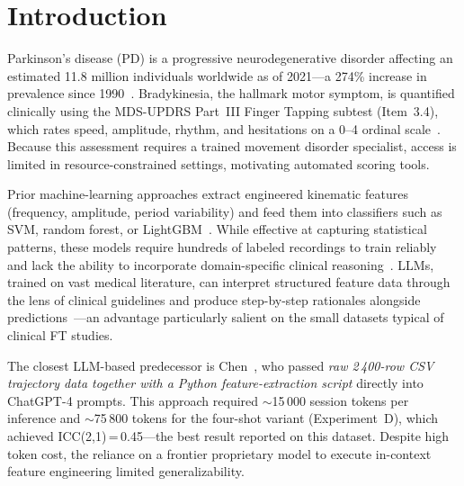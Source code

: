 \documentclass[conference]{IEEEtran}
\begin{document}
\section{Introduction}

Parkinson's disease (PD) is a progressive neurodegenerative disorder affecting an
estimated 11.8 million individuals worldwide as of 2021---a 274\% increase in prevalence
since 1990~\cite{steinmetz2024global}.
Bradykinesia, the hallmark motor symptom, is quantified clinically using the
MDS-UPDRS Part~III Finger Tapping subtest (Item~3.4), which rates speed, amplitude,
rhythm, and hesitations on a 0--4 ordinal scale~\cite{cite_updrs}.
Because this assessment requires a trained movement disorder specialist, access is limited
in resource-constrained settings, motivating automated scoring tools.

Prior machine-learning approaches extract engineered kinematic features (frequency,
amplitude, period variability) and feed them into classifiers such as SVM, random forest,
or LightGBM~\cite{cite_ml_motor,cite_ml_motor2,yang2024deep}.
While effective at capturing statistical patterns, these models require hundreds of labeled
recordings to train reliably and lack the ability to incorporate domain-specific clinical
reasoning~\cite{sarker2022ai}.
LLMs, trained on vast medical literature, can interpret structured feature data through
the lens of clinical guidelines and produce step-by-step rationales alongside
predictions~\cite{minaee2024large}---an advantage particularly salient on the small
datasets typical of clinical FT studies.

The closest LLM-based predecessor is Chen~\cite{chen2024chatgpt}, who passed
\emph{raw 2\,400-row CSV trajectory data together with a Python feature-extraction
script} directly into ChatGPT-4 prompts.
This approach required $\sim$15\,000 session tokens per inference and $\sim$75\,800 tokens
for the four-shot variant (Experiment~D), which achieved ICC(2,1)\,=\,0.45---the
best result reported on this dataset.
Despite high token cost, the reliance on a frontier proprietary model to execute in-context
feature engineering limited generalizability.
\end{document}
